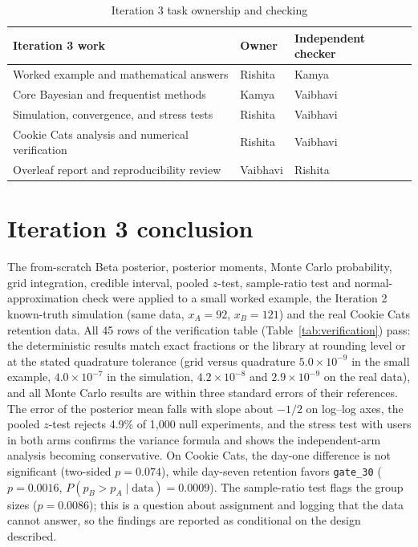 \documentclass[11pt]{article}
\begin{document}
\begin{table}[H]
\centering
\small
\begin{tabular}{p{}p{}p{}}
\toprule
\textbf{Iteration 3 work} & \textbf{Owner} & \textbf{Independent checker}\\
\midrule
Worked example and mathematical answers & Rishita &  Kamya\\
Core Bayesian and frequentist methods & Kamya & Vaibhavi\\
Simulation, convergence, and stress tests & Rishita & Vaibhavi\\
Cookie Cats analysis and numerical verification & Rishita & Vaibhavi\\
Overleaf report and reproducibility review & Vaibhavi & Rishita\\
\bottomrule
\end{tabular}
\caption{Iteration 3 task ownership and checking}
\end{table}

\section{Iteration 3 conclusion}
The from-scratch Beta posterior, posterior moments, Monte Carlo probability, grid integration, credible interval, pooled $z$-test, sample-ratio test and normal-approximation check were applied to a small worked example, the Iteration 2 known-truth simulation (same data, $x_A=92$, $x_B=121$) and the real Cookie Cats retention data. All 45 rows of the verification table (Table~\ref{tab:verification}) pass: the deterministic results match exact fractions or the library at rounding level or at the stated quadrature tolerance (grid versus quadrature $5.0\times10^{-9}$ in the small example, $4.0\times10^{-7}$ in the simulation, $4.2\times10^{-8}$ and $2.9\times10^{-9}$ on the real data), and all Monte Carlo results are within three standard errors of their references. The error of the posterior mean falls with slope about $-1/2$ on log--log axes, the pooled $z$-test rejects 4.9\% of 1{,}000 null experiments, and the stress test with users in both arms confirms the variance formula and shows the independent-arm analysis becoming conservative. On Cookie Cats, the day-one difference is not significant (two-sided $p=0.074$), while day-seven retention favors \texttt{gate\_30} ($p=0.0016$, $P(p_B>p_A\mid\text{data})=0.0009$). The sample-ratio test flags the group sizes ($p=0.0086$); this is a question about assignment and logging that the data cannot answer, so the findings are reported as conditional on the design described.

\nocite{*}


\end{document}
